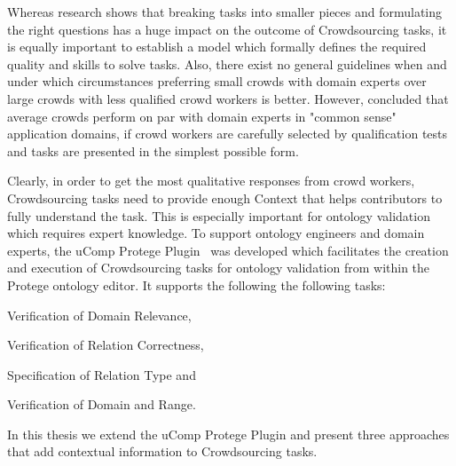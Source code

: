 Whereas research shows that breaking tasks into smaller pieces and formulating the right questions has a huge impact on the outcome of Crowdsourcing tasks, it is equally important to establish a model which formally defines the required quality and skills to solve tasks. Also, there exist no general guidelines when and under which circumstances preferring small crowds with domain experts over large crowds with less qualified crowd workers is better. However, \cite{mortensen2013} concluded that average crowds perform on par with domain experts in "common sense" application domains, if crowd workers are carefully selected by qualification tests and tasks are presented in the simplest possible form.


Clearly, in order to get the most qualitative responses from crowd workers, Crowdsourcing tasks need to provide enough Context that helps contributors to fully understand the task. This is especially important for ontology validation which requires expert knowledge. To support ontology engineers and domain experts, the uComp Protege Plugin~\cite{wohlgenannt2016} was developed which facilitates the creation and execution of Crowdsourcing tasks for ontology validation from within the Protege ontology editor. It supports the following the following tasks:
\begin{inparaenum}[1)]
		\item Verification of Domain Relevance,
		\item Verification of Relation Correctness,
		\item Specification of Relation Type and 
		\item Verification of Domain and Range.
\end{inparaenum}

In this thesis we extend the uComp Protege Plugin and present three approaches that add contextual information to Crowdsourcing tasks.
